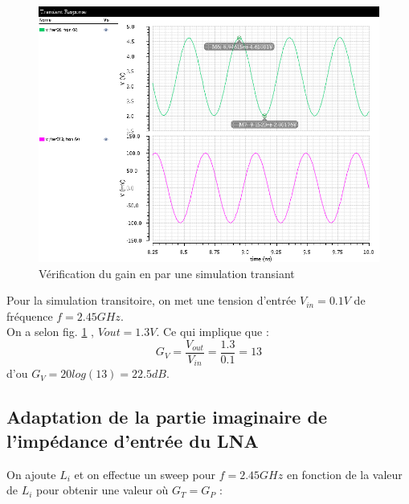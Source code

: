 \documentclass[a4paper]{article}
\begin{document}
\begin{figure}[!htb]
\begin{center}
  \includegraphics[scale=0.45]{Q4-Gv-tran.png}
  \caption{V\'erification du gain en par une simulation transiant}
  \label{sim-transiant-gv}
\end{center}
\end{figure}

Pour la simulation transitoire, on met une tension d'entr\'ee $V_{in} = 0.1 V$ de fr\'equence $f = 2.45 GHz$.\\
On a selon fig. \ref{sim-transiant-gv} , $Vout = 1.3 V$.
Ce qui implique que :
\[
G_V = \frac{V_{out}}{V_{in}} = \frac{1.3}{0.1} = 13
\]
d'ou $G_V = 20log(13) = 22.5 dB$.

\subsection{Adaptation de la partie imaginaire de l'imp\'edance d'entr\'ee du LNA}
On ajoute $L_i$ et on effectue un sweep pour $f=2.45GHz$ en fonction de la valeur de $L_i$
pour obtenir une valeur o\`u $G_T = G_P$ :
\end{document}
